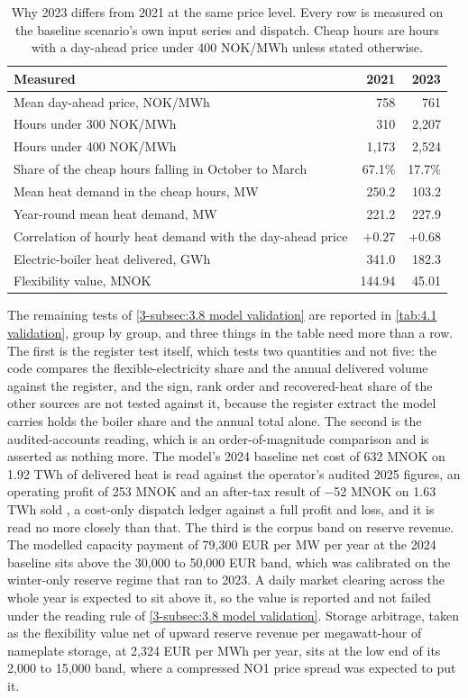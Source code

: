 \begin{table}[htbp]
\centering
\caption{Why 2023 differs from 2021 at the same price level. Every row is measured on the baseline scenario's own input series and dispatch. Cheap hours are hours with a day-ahead price under 400 NOK/MWh unless stated otherwise.}
\small
\begin{tabular}{p{7.4cm} r r}
\toprule
\textbf{Measured} & \textbf{2021} & \textbf{2023} \\
\midrule
Mean day-ahead price, NOK/MWh & 758 & 761 \\
Hours under 300 NOK/MWh & 310 & 2{,}207 \\
Hours under 400 NOK/MWh & 1{,}173 & 2{,}524 \\
Share of the cheap hours falling in October to March & 67.1\% & 17.7\% \\
Mean heat demand in the cheap hours, MW & 250.2 & 103.2 \\
Year-round mean heat demand, MW & 221.2 & 227.9 \\
Correlation of hourly heat demand with the day-ahead price & $+0.27$ & $+0.68$ \\
Electric-boiler heat delivered, GWh & 341.0 & 182.3 \\
Flexibility value, MNOK & 144.94 & 45.01 \\
\bottomrule
\end{tabular}
\label{tab:4.1 2023 mechanism}
\end{table}

The remaining tests of \autoref{3-subsec:3.8 model validation} are reported in \autoref{tab:4.1 validation}, group by group, and three things in the table need more than a row. The first is the register test itself, which tests two quantities and not five: the code compares the flexible-electricity share and the annual delivered volume against the register, and the sign, rank order and recovered-heat share of the other sources are not tested against it, because the register extract the model carries holds the boiler share and the annual total alone. The second is the audited-accounts reading, which is an order-of-magnitude comparison and is asserted as nothing more. The model's 2024 baseline net cost of 632 MNOK on 1.92 TWh of delivered heat is read against the operator's audited 2025 figures, an operating profit of 253 MNOK and an after-tax result of $-$52 MNOK on 1.63 TWh sold \cite{hafslund_arsrapport_nodate}, a cost-only dispatch ledger against a full profit and loss, and it is read no more closely than that. The third is the corpus band on reserve revenue. The modelled capacity payment of 79{,}300 EUR per MW per year at the 2024 baseline sits above the 30{,}000 to 50{,}000 EUR band, which was calibrated on the winter-only reserve regime that ran to 2023. A daily market clearing across the whole year is expected to sit above it, so the value is reported and not failed under the reading rule of \autoref{3-subsec:3.8 model validation}. Storage arbitrage, taken as the flexibility value net of upward reserve revenue per megawatt-hour of nameplate storage, at 2{,}324 EUR per MWh per year, sits at the low end of its 2{,}000 to 15{,}000 band, where a compressed NO1 price spread was expected to put it.

